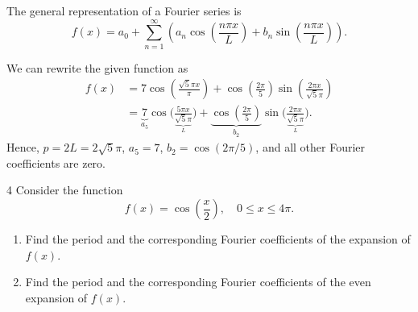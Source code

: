 \begin{derivation}
  The general representation of a Fourier series is
  \begin{equation*}
    f(x) = a_0 + \sum_{n = 1}^{\infty} \left( a_n \cos \left( \frac{n \pi x}{L} \right) + b_n \sin \left( \frac{n \pi x}{L} \right) \right)
  .\end{equation*}
 
  We can rewrite the given function as
  \begin{align*}
    f(x) &= 7 \cos \left( \frac{\sqrt{5} \pi x}{\pi} \right) + \cos \left( \frac{2\pi}{5} \right) \sin \left( \frac{2 \pi x}{\sqrt{5} \pi} \right) \\
         &= \underbrace{7}_{a_5} \cos \bigg( \frac{5 \pi x}{\underbrace{\sqrt{5} \pi}_L} \bigg) + \underbrace{\cos \left( \frac{2 \pi}{5} \right)}_{b_2} \sin \bigg( \frac{2 \pi x}{\underbrace{\sqrt{5}\pi}_L} \bigg)
  .\end{align*}
  Hence, $p = 2L = 2 \sqrt{5}\pi$, $a_5 = 7$, $b_2 = \cos (2\pi / 5)$, and all other Fourier coefficients are zero.
\end{derivation}


\begin{problem}{4}
  Consider the function
  \begin{equation*}
    f(x) = \cos \left( \frac{x}{2} \right), \quad 0 \leq x \leq 4\pi
  .\end{equation*}
  
  \begin{enumerate}
    \item Find the period and the corresponding Fourier coefficients of the expansion of $f(x)$.
    \item Find the period and the corresponding Fourier coefficients of the even expansion of $f(x)$.
  \end{enumerate}
\end{problem}

